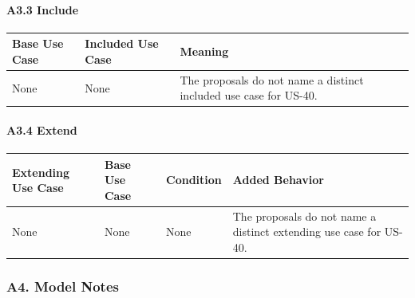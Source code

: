 \documentclass[12pt]{article}
\renewcommand{\baselinestretch}{1.5}
\begin{document}
\paragraph*{A3.3 Include}
\par\medskip

\begingroup
\small
\renewcommand{\baselinestretch}{1.0}\selectfont
\renewcommand{\arraystretch}{1.15}
\setlength{\tabcolsep}{6pt}
\begin{longtable}{|>{\raggedright\arraybackslash}p{}|>{\raggedright\arraybackslash}p{}|>{\raggedright\arraybackslash}p{}|}
\hline
\textbf{Base Use Case} & \textbf{Included Use Case} & \textbf{Meaning} \\ \hline
\endhead
None & None & The proposals do not name a distinct included use case for US-40. \\ \hline
\end{longtable}
\endgroup
\par\medskip

\hypertarget{sec:a3-4-extend}{}
\paragraph*{A3.4 Extend}
\par\medskip

\begingroup
\small
\renewcommand{\baselinestretch}{1.0}\selectfont
\renewcommand{\arraystretch}{1.15}
\setlength{\tabcolsep}{6pt}
\begin{longtable}{|>{\raggedright\arraybackslash}p{}|>{\raggedright\arraybackslash}p{}|>{\raggedright\arraybackslash}p{}|>{\raggedright\arraybackslash}p{}|}
\hline
\textbf{Extending Use Case} & \textbf{Base Use Case} & \textbf{Condition} & \textbf{Added Behavior} \\ \hline
\endhead
None & None & None & The proposals do not name a distinct extending use case for US-40. \\ \hline
\end{longtable}
\endgroup
\par\medskip

\hypertarget{sec:a4-model-notes}{}
\subsubsection*{A4. Model Notes}
\par\medskip
\end{document}

